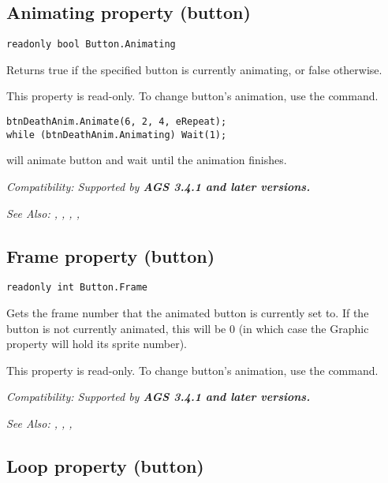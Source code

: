 \subsection{Animating property (button)}\label{Button.Animating}%

\begin{verbatim}
readonly bool Button.Animating
\end{verbatim}
Returns true if the specified button is currently animating, or false otherwise.

This property is read-only. To change button's animation, use the
 command.

\begin{verbatim}
btnDeathAnim.Animate(6, 2, 4, eRepeat);
while (btnDeathAnim.Animating) Wait(1);
\end{verbatim}
will animate button and wait until the animation finishes.

\it{Compatibility:} Supported by \bf{AGS 3.4.1} and later versions.

\it{See Also:} ,
,
,
,


\subsection{Frame property (button)}\label{Button.Frame}%

\begin{verbatim}
readonly int Button.Frame
\end{verbatim}
Gets the frame number that the animated button is currently set to. If the button is not currently
animated, this will be 0 (in which case the Graphic property will
hold its sprite number).

This property is read-only. To change button's animation, use the
 command.

\it{Compatibility:} Supported by \bf{AGS 3.4.1} and later versions.

\it{See Also:} ,
,
,


\subsection{Loop property (button)}\label{Button.Loop}%

